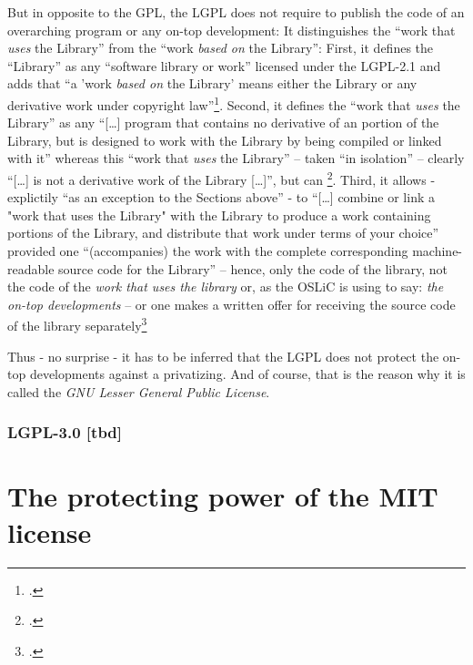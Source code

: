 But in opposite to the GPL, the LGPL does not require to publish the code of an
overarching program or any on-top development: It distinguishes the
\enquote{work that \emph{uses} the Library} from the \enquote{work \emph{based
on} the Library}: First, it defines the \enquote{Library} as any
\enquote{software library or work} licensed under the LGPL-2.1 and adds that
\enquote{a 'work \emph{based on} the Library' means either the Library or any
derivative work under copyright law}\footcite[cf.][\nopage wp
§0]{Lgpl21OsiLicense1999a}. Second, it defines the \enquote{work that \emph{uses}
the Library} as any \enquote{[\ldots] program that contains no derivative of an
portion of the Library, but is designed to work with the Library by being
compiled or linked with it} whereas this \enquote{work that \emph{uses} the
Library} -- taken \enquote{in isolation} -- clearly \enquote{[\ldots] is not a
derivative work of the Library [\ldots]}, but can \footcite[cf.][\nopage wp
§5]{Lgpl21OsiLicense1999a}. Third, it allows - explictily \enquote{as an
exception to the Sections above} - to \enquote{[\ldots] combine or link a "work
that uses the Library" with the Library to produce a work containing portions of
the Library, and distribute that work under terms of your choice} provided one
\enquote{(accompanies) the work with the complete corresponding machine-readable
source code for the Library} -- hence, only the code of the library, not the
code of the \emph{work that uses the library} or, as the OSLiC is using to say:
\emph{the on-top developments} -- or one makes a written offer for receiving the
source code of the library separately\footcite[cf.][\nopage wp
§6]{Lgpl21OsiLicense1999a}

Thus - no surprise - it has to be inferred that the LGPL does not protect the
on-top developments against a privatizing. And of course, that is the reason why
it is called the \emph{GNU \emph{Lesser} General Public License}.


\subsubsection {LGPL-3.0 [tbd]}\label{subsec:ProtectingPowerOfLgpl30}



\section{The protecting power of the MIT license}
\label{sec:ProtectingPowerOfMit}

